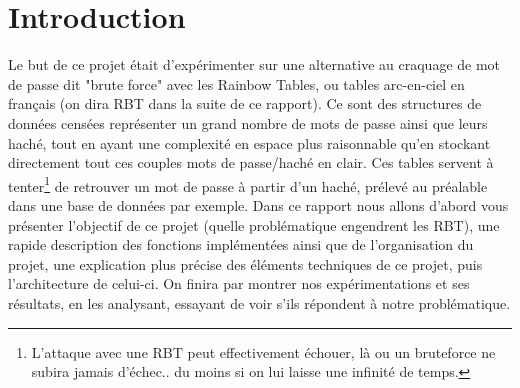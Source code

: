 \documentclass[french,12pt]{article}
\begin{document}
    \tableofcontents

\newpage


    \section{Introduction}

    
    Le but de ce projet était d'expérimenter sur une alternative au craquage de mot de passe dit "brute force" avec les Rainbow Tables, ou tables arc-en-ciel en français (on dira RBT dans la suite de ce rapport). Ce sont des structures de données censées représenter un grand nombre de mots de passe ainsi que leurs haché, tout en ayant une complexité en espace plus raisonnable qu'en stockant directement tout ces couples mots de passe/haché en clair.
    Ces tables servent à tenter\footnote{L'attaque avec une RBT peut effectivement échouer, là ou un bruteforce ne subira jamais d'échec.. du moins si on lui laisse une infinité de temps.} de retrouver un mot de passe à partir d'un haché, prélevé au préalable dans une base de données par exemple. 
    \newline
    \indent Dans ce rapport nous allons d'abord vous présenter l'objectif de ce projet (quelle problématique engendrent les RBT), une rapide description des fonctions implémentées ainsi que de l'organisation du projet, une explication plus précise des éléments techniques de ce projet, puis l'architecture de celui-ci. On finira par montrer nos expérimentations et ses résultats, en les analysant, essayant de voir s'ils répondent à notre problématique.
\end{document}

